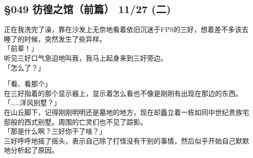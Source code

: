 \subsection{§049 彷徨之馆（前篇） 11/27 (二)}

正在我洗完了澡，靠在沙发上无奈地看着依旧沉迷于FPS的三好，想着差不多该去睡了的时候，突然发生了些异样。\\

「前辈！」\\

听见三好口气急迫地叫我，我马上起身来到三好旁边。\\

「怎么了？」

「看、看那个」\\

在三好指着的那个显示器上，显示着怎么看也不像是刚刚有出现在那边的东西。\\

「……洋风别墅？」\\

在山丘脚下，记得刚刚明明还是墓地的地方，现在却矗立着一栋如同中世纪贵族宅邸般的西式别墅。周围的亡灵们也不见了踪影。\\

「那是什么啊？三好你干了啥？」\\

三好呼呼地摇了摇头，表示自己除了打怪没有干别的事情，然后似乎开始自己默默地分析起了原因。\\

